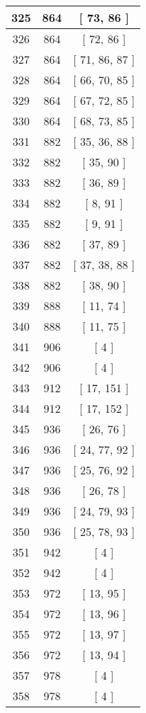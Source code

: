 \begin{center}
\begin{longtable}[H]{|| c c c ||}
\hline
325 & 864 & [ 73, 86 ] \\ 
\hline
326 & 864 & [ 72, 86 ] \\ 
\hline
327 & 864 & [ 71, 86, 87 ] \\ 
\hline
328 & 864 & [ 66, 70, 85 ] \\ 
\hline
329 & 864 & [ 67, 72, 85 ] \\ 
\hline
330 & 864 & [ 68, 73, 85 ] \\ 
\hline
331 & 882 & [ 35, 36, 88 ] \\ 
\hline
332 & 882 & [ 35, 90 ] \\ 
\hline
333 & 882 & [ 36, 89 ] \\ 
\hline
334 & 882 & [ 8, 91 ] \\ 
\hline
335 & 882 & [ 9, 91 ] \\ 
\hline
336 & 882 & [ 37, 89 ] \\ 
\hline
337 & 882 & [ 37, 38, 88 ] \\ 
\hline
338 & 882 & [ 38, 90 ] \\ 
\hline
339 & 888 & [ 11, 74 ] \\ 
\hline
340 & 888 & [ 11, 75 ] \\ 
\hline
341 & 906 & [ 4 ] \\ 
\hline
342 & 906 & [ 4 ] \\ 
\hline
343 & 912 & [ 17, 151 ] \\ 
\hline
344 & 912 & [ 17, 152 ] \\ 
\hline
345 & 936 & [ 26, 76 ] \\ 
\hline
346 & 936 & [ 24, 77, 92 ] \\ 
\hline
347 & 936 & [ 25, 76, 92 ] \\ 
\hline
348 & 936 & [ 26, 78 ] \\ 
\hline
349 & 936 & [ 24, 79, 93 ] \\ 
\hline
350 & 936 & [ 25, 78, 93 ] \\ 
\hline
351 & 942 & [ 4 ] \\ 
\hline
352 & 942 & [ 4 ] \\ 
\hline
353 & 972 & [ 13, 95 ] \\ 
\hline
354 & 972 & [ 13, 96 ] \\ 
\hline
355 & 972 & [ 13, 97 ] \\ 
\hline
356 & 972 & [ 13, 94 ] \\ 
\hline
357 & 978 & [ 4 ] \\ 
\hline
358 & 978 & [ 4 ] \\ 
\hline
\end{longtable}
\end{center}
